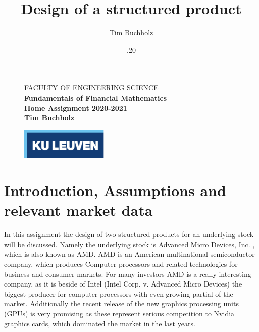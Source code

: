 \documentclass[11pt,oneside,a4paper]{article}
\title{\vspace*{40.0mm}
	\bf\sf Design of a structured product
	\vspace*{20.0mm} \\
	\vspace*{40.0mm}
}
\author{\sf Tim Buchholz}
\date{\sf 20.11.20}
\makeatletter
\def\cleardoublepage{\clearpage\if@twoside \ifodd\c@page\else%
	\hbox{}%
	\thispagestyle{empty}%
	\clearpage%
	\if@twocolumn\hbox{}\clearpage\fi\fi\fi}
\makeatother
\begin{document}
	
	\begin{figure}
		\parbox[t]{125mm}{
			\vspace*{6mm}
			\scriptsize\sf           FACULTY OF ENGINEERING SCIENCE\\
			\scriptsize\sf\bfseries  Fundamentals of Financial Mathematics \\
			\scriptsize\sf           Home Assignment 2020-2021 \\
			\scriptsize\sf           Tim Buchholz}
		\parbox[t]{40mm}{
			\begin{flushright}
				\includegraphics[height=15mm]{logo-eps-converted-to.pdf}
		\end{flushright}}
	\end{figure}
	
	\maketitle
	\thispagestyle{empty}
	\raggedbottom
	
	\cleardoublepage
	\setcounter{tocdepth}{2}
	
	\tableofcontents
	
	\cleardoublepage
	
	\section{Introduction, Assumptions and relevant market data}
	In this assignment the design of two structured products for an underlying stock will be discussed. Namely the underlying stock is Advanced Micro Devices, Inc. , which is also known as AMD. AMD is an American multinational semiconductor company, which produces Computer processors and related technologies for business and consumer markets. 
	For many investors AMD is a really interesting company, as it is beside of Intel (Intel Corp. v. Advanced Micro Devices) the biggest producer for computer processors with even growing partial of the market. 
	Additionally the recent release of the new graphics processing units (GPUs) is very promising as these represent serious competition to Nvidia graphics cards, which dominated the market in the last years.
	
\end{document}

